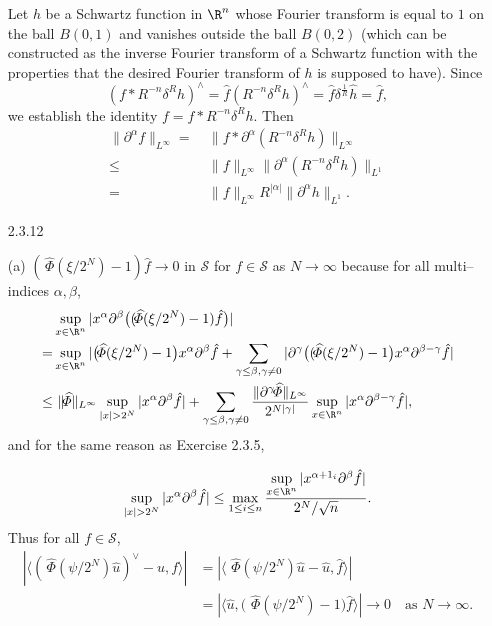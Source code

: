\begin{itemize}
Let $h$ be a Schwartz function in $\R^n$ whose Fourier transform 
is equal to $1$ on the ball $B(0,1)$ and vanishes outside the ball $B(0,2)$ 
(which can be  constructed as the inverse Fourier transform of 
a Schwartz function with the properties that 
the desired Fourier transform of $h$ is supposed to have). Since
$$(f*R^{-n}\delta^R h)^\wedge=\hat{f}(R^{-n}\delta^R h)^\wedge
=\hat{f}\delta^{\frac{1}{R}}\hat{h}=\hat{f},$$
we establish the identity $f=f*R^{-n}\delta^R h$.
Then
\begin{align*}
\|\partial^\alpha f\|_{L^\infty}
=&\ \|f*\partial^\alpha(R^{-n}\delta^R h)\|_{L^\infty}\\
\leq&\ \|f\|_{L^\infty}\|\partial^\alpha(R^{-n}\delta^R h)\|_{L^1}\\
=&\ \|f\|_{L^\infty}R^{|\alpha|}\|\partial^\alpha h\|_{L^1}.
\end{align*}

\item[2.3.12]

(a) $(\,\widehat{\!\!\varPhi}(\xi/2^N)-1)\hat{f}\rightarrow0$ in $\mathscr{S}$ 
for $f\in\mathscr{S}$ as $N\rightarrow\infty$
because for all multi--indices $\alpha,\beta$,
\begin{align*}
    &\sup_{x\in\R^n} |x^\alpha\partial^\beta \big((\,\widehat{\!\!\varPhi}(\xi/2^N)-1)\hat{f}\big)|\\
    =&\sup_{x\in\R^n} |\big(\,\widehat{\!\!\varPhi}(\xi/2^N)-1\big)x^\alpha \partial^\beta\hat{f}+
    \sum_{\gamma\leq\beta,\gamma\neq0} |\partial^\gamma\big((\,\widehat{\!\!\varPhi}(\xi/2^N)-1\big)x^\alpha\partial^{\beta-\gamma}\hat{f}|\\
    \leq&\ \|\,\widehat{\!\!\varPhi}\|_{L^\infty}\sup_{|x|>2^N}|x^\alpha\partial^\beta \hat{f}|
    +\sum_{\gamma\leq\beta,\gamma\neq0}\frac{\|\partial^\gamma\,\widehat{\!\!\varPhi}\|_{L^\infty}}{2^{N|\gamma|}}\sup_{x\in\R^n}|x^\alpha\partial^{\beta-\gamma}\hat{f}|,
\end{align*}
and for the same reason as Exercise 2.3.5,

$$\sup_{|x|>2^N} |x^\alpha\partial^\beta \hat{f}|
\leq\max\limits_{1\leq i\leq n}\frac{\sup\limits_{x\in\R^n}|x^{\alpha+1_i}\partial^\beta \hat{f}|}{2^N/\sqrt{n}}.$$
Thus for all $f\in\mathscr{S}$,
\begin{align*}
    |\langle (\,\widehat{\!\!\varPhi}(\psi/2^N)\widehat{u})^\vee-u,f\rangle|
    &=|\langle \,\,\widehat{\!\!\varPhi}(\psi/2^N)\widehat{u}-\widehat{u},\hat{f}\rangle|\\
    &=|\langle \widehat{u},\big(\,\,\widehat{\!\!\varPhi}(\psi/2^N)-1\big)\hat{f}\rangle|\rightarrow 0 \quad \text{as } N\rightarrow\infty.
\end{align*}


\end{itemize}

